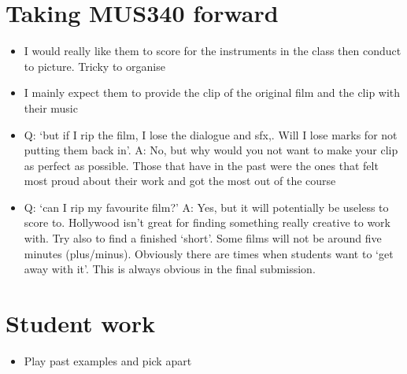 \section{Taking MUS340 forward}
\begin{itemize}
\item I would really like them to score for the instruments in the class then conduct to picture. Tricky to organise
\item I mainly expect them to provide the clip of the original film and the clip with their music
\item Q: `but if I rip the film, I lose the dialogue and sfx,. Will I lose marks for not putting them back in'. A: No, but why would you not want to make your clip as perfect as possible. Those that have in the past were the ones that felt most proud about their work and got the most out of the course
\item Q: `can I rip my favourite film?' A: Yes, but it will potentially be useless to score to. Hollywood isn't great for finding something really creative to work with. Try also to find a finished `short'. Some films will not be around five minutes (plus/minus). Obviously there are times when students want to `get away with it'. This is always obvious in the final submission. 
\end{itemize}

\section{Student work}
\begin{itemize}
\item Play past examples and pick apart
\end{itemize}



